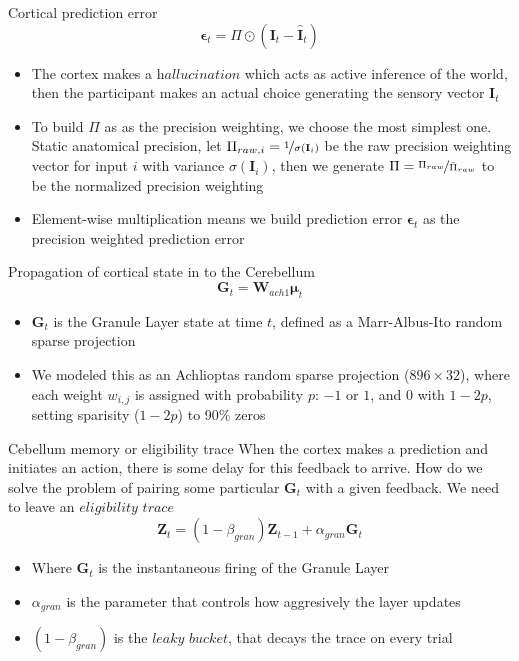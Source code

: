 \documentclass{beamer}
\begin{document}
	\begin{frame}{Cortical prediction error}
		\begin{equation}
			\boldsymbol{\epsilon}_{t} = \Pi \odot (\mathbf{I}_{t} - \hat{\mathbf{I}}_{t})
		\end{equation}
		\begin{itemize}
			\item The cortex makes a $\textit{hallucination}$ which acts as active inference of the world, then the participant makes an actual choice generating the sensory vector $\mathbf{I}_{t}$
			\item To build $\Pi$ as as the precision weighting, we choose the most simplest one. Static anatomical precision, let $\Pi_{raw, i} = \nicefrac{1}{\sigma(\mathbf{I}_{i})}$ be the raw precision weighting vector for input $i$ with variance $\sigma(\mathbf{I}_{i})$, then we generate $\Pi = \nicefrac{\Pi_{raw}}{\bar{\Pi}_{raw}}$ to be the normalized precision weighting
			\item Element-wise multiplication means we build prediction error $\boldsymbol{\epsilon}_t$ as the precision weighted prediction error
		\end{itemize}
	\end{frame}
	
	\begin{frame}{Propagation of cortical state in to the Cerebellum}
		\begin{equation}
			\mathbf{G}_{t} = \mathbf{W}_{ach1} \boldsymbol{\mu}_{t}
		\end{equation}
		\begin{itemize}
			\item $\mathbf{G}_{t}$ is the Granule Layer state at time $t$, defined as a Marr-Albus-Ito random sparse projection
			\item We modeled this as an Achlioptas random sparse projection ($896 \times 32$), where each weight $w_{i, j}$ is assigned with probability $p$: $-1$ or $1$, and 0 with $1 - 2p$, setting sparisity ($1 - 2p$) to 90\% zeros
		\end{itemize}
	\end{frame}
	
	\begin{frame}{Cebellum memory or eligibility trace}
		When the cortex makes a prediction and initiates an action, there is some delay for this feedback to arrive. How do we solve the problem of pairing some particular $\mathbf{G}_{t}$ with a given feedback. We need to leave an $\textit{eligibility trace}$
		\begin{equation}
			\mathbf{Z}_{t} = (1 - \beta_{gran}) \mathbf{Z}_{t-1} + \alpha_{gran} \mathbf{G}_{t}
		\end{equation}
		\begin{itemize}
			\item Where $\mathbf{G}_{t}$ is the instantaneous firing of the Granule Layer
			\item $\alpha_{gran}$ is the parameter that controls how aggresively the layer updates
			\item $(1 - \beta_{gran})$ is the $\textit{leaky bucket}$, that decays the trace on every trial
		\end{itemize}
	\end{frame}
	
\end{document}

